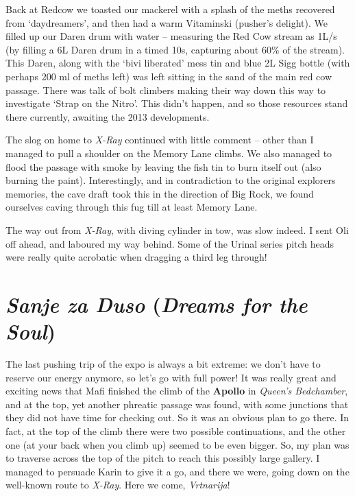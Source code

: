 Back at Redcow we toasted our mackerel with a splash of the meths
recovered from `daydreamers', and then had a warm Vitaminski (pusher's
delight). We filled up our Daren drum with water -- measuring the Red
Cow stream as 1L/s (by filling a 6L Daren drum in a timed 10s, capturing
about 60\% of the stream). This Daren, along with the `bivi liberated'
mess tin and blue 2L Sigg bottle (with perhaps 200 ml of meths left) was
left sitting in the sand of the main red cow passage. There was talk of
bolt climbers making their way down this way to investigate `Strap on
the Nitro'. This didn't happen, and so those resources stand there
currently, awaiting the 2013 developments.

The slog on home to \emph{X-Ray} continued with little comment -- other
than I managed to pull a shoulder on the Memory Lane climbs. We also
managed to flood the passage with smoke by leaving the fish tin to burn
itself out (also burning the paint). Interestingly, and in contradiction
to the original explorers memories, the cave draft took this in the
direction of Big Rock, we found ourselves caving through this fug till
at least Memory Lane.

The way out from \emph{X-Ray}, with diving cylinder in tow, was slow
indeed. I sent Oli off ahead, and laboured my way behind. Some of the
Urinal series pitch heads were really quite acrobatic when dragging a
third leg through!


\hypertarget{sanje-za-duso-dreams-for-the-soul}{%
\section{\texorpdfstring{\emph{Sanje za Duso} (\emph{Dreams for the
Soul})}{Sanje za Duso (Dreams for the Soul)}}\label{sanje-za-duso-dreams-for-the-soul}}

The last pushing trip of the expo is always a bit extreme: we don't have
to reserve our energy anymore, so let's go with full power! It was
really great and exciting news that Mafi finished the climb of the
\textbf{Apollo} in \emph{Queen's Bedchamber}, and at the top, yet
another phreatic passage was found, with some junctions that they did
not have time for checking out. So it was an obvious plan to go there.
In fact, at the top of the climb there were two possible continuations,
and the other one (at your back when you climb up) seemed to be even
bigger. So, my plan was to traverse across the top of the pitch to reach
this possibly large gallery. I managed to persuade Karin to give it a
go, and there we were, going down on the well-known route to
\emph{X-Ray}. Here we come, \emph{Vrtnarija}!

